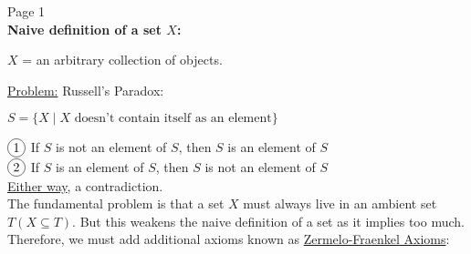 \documentclass{article}
\newcommand{\circled}[1]{\tikz[baseline=(char.base)]{\node[shape=circle,draw,inner sep=2pt] (char) {#1};}}
\begin{document}
\begin{flushleft}
    Page 1 \\
    \vspace*{1em}
\textbf{Naive definition of a set $X$:}\\
\vspace*{0.5em}
\centerline{$X$ = an arbitrary collection of objects.    }
\vspace*{0.5em}
\underline{Problem:} Russell's Paradox:\\
\vspace*{0.5em}
\centerline{$S = \{X \mid X \text{ doesn't contain itself as an element}\}$}
\vspace*{0.5em}
\quad$\circled{1}$ If $S$ is not an element of $S$, then $S$ is an element of $S$\\
\vspace*{0.5em}
\quad$\circled{2}$ If $S$ is an element of $S$, then $S$ is not an element of $S$\\
\vspace*{0.5em}
\quad \underline{Either way}, a contradiction.\\
\vspace*{1em}
The fundamental problem is that a set $X$ must always live in an ambient set $T(X \subseteq T)$. 
But this weakens the naive definition of a set as it implies too much. Therefore, we must add additional axioms known as \underline{Zermelo-Fraenkel Axioms}:
\end{flushleft}
\end{document}
